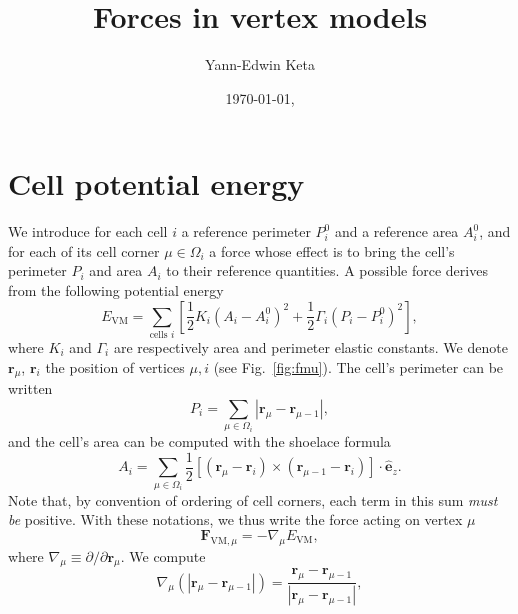 \documentclass[aps, superscriptaddress, notitlepage]{revtex4-1}
\begin{document}

\title{Forces in vertex models}
\author{Yann-Edwin Keta}
\date{\today, \currenttime}
\maketitle


\section{Cell potential energy}

We introduce for each cell $i$ a reference perimeter $P^0_i$ and a reference area $A^0_i$, and for each of its cell corner $\mu \in \Omega_i$ a force whose effect is to bring the cell's perimeter $P_i$ and area $A_i$ to their reference quantities. A possible force derives from the following potential energy \cite{farhadifar2007influence,fletcher2014vertex,bi2016motilitydriven,sknepnek2023generating}
\begin{equation}
E_{\mathrm{VM}} = \sum_{\text{cells } i} \left[\frac{1}{2} K_i (A_i - A_i^0)^2 + \frac{1}{2} \Gamma_i (P_i - P_i^0)^2\right],
\label{eq:evm}
\end{equation}
where $K_i$ and $\Gamma_i$ are respectively area and perimeter elastic constants. We denote $\boldsymbol{r}_{\mu}$, $\boldsymbol{r}_i$ the position of vertices $\mu, i$ (see Fig.~\ref{fig:fmu}). The cell's perimeter can be written
\begin{equation}
P_i = \sum_{\mu \in \Omega_i} |\boldsymbol{r}_{\mu} - \boldsymbol{r}_{\mu - 1}|,
\end{equation}
and the cell's area can be computed with the shoelace formula
\begin{equation}
A_i = \sum_{\mu \in \Omega_i} \frac{1}{2} [(\boldsymbol{r}_{\mu} - \boldsymbol{r}_{i}) \times (\boldsymbol{r}_{\mu - 1} - \boldsymbol{r}_{i})] \cdot \hat{\boldsymbol{e}}_z.
\end{equation}
Note that, by convention of ordering of cell corners, each term in this sum \textit{must be} positive. With these notations, we thus write the force acting on vertex $\mu$
\begin{equation}
\boldsymbol{F}_{\mathrm{VM},\mu} = -\nabla_{\mu} E_{\mathrm{VM}},
\label{eq:fmugrade}
\end{equation}
where $\nabla_{\mu} \equiv \partial/\partial \boldsymbol{r}_{\mu}$. We compute
\begin{equation}
\nabla_{\mu} \left(|\boldsymbol{r}_{\mu} - \boldsymbol{r}_{\mu - 1}|\right) = \frac{\boldsymbol{r}_{\mu} - \boldsymbol{r}_{\mu - 1}}{|\boldsymbol{r}_{\mu} - \boldsymbol{r}_{\mu - 1}|},
\end{equation}
\end{document}
